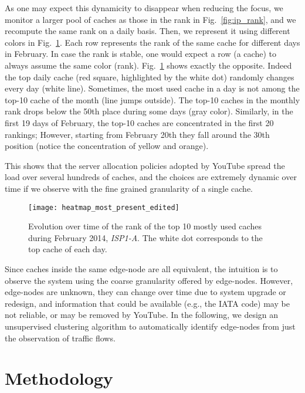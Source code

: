 \documentclass{acm_proc_article-sp}
\newcommand{\node}{{edge-node}\xspace}
\newcommand{\nodes}{{edge-nodes}\xspace}
\newcommand{\TApub}{\textit{ISP1-A}\xspace}
\begin{document}
As one may expect this dynamicity to disappear when reducing the focus, we monitor a larger pool of caches as those in the rank in Fig.~\ref{fig:ip_rank}, and we recompute the same rank on a daily basis. Then, we represent it using different colors in Fig.~\ref{fig:ip_monitoring}. Each row represents the rank of the same cache for different days in February.
In case the rank is stable, one would expect a row (a cache) to always assume the same color (rank). Fig.~\ref{fig:ip_monitoring} shows exactly the opposite. Indeed the top daily cache (red square, highlighted by the white dot) randomly changes every day (white line). Sometimes, the most used cache in a day is not among the top-10 cache of the month (line jumps outside). The top-10 caches in the monthly rank drops below the 50th place during some days (gray color). Similarly, in the first 19 days of February, the top-10 caches are concentrated in the first 20 rankings; However, starting from February 20th they fall around the 30th position (notice the concentration of yellow and orange).

This shows that the server allocation policies adopted by YouTube spread the load over several hundreds of caches, and the choices are extremely dynamic over time if we observe with the fine grained granularity of a single cache.


\begin{figure}[t!]
\centering
    \texttt{[image: heatmap\_most\_present\_edited]}
    \caption{Evolution over time of the rank of the top 10 mostly used caches during February 2014, \TApub. The white dot corresponds to the top cache of each day.}
    \label{fig:ip_monitoring}
\end{figure}


Since caches inside the same \node are all equivalent, the intuition is to observe the system using the coarse granularity offered by \nodes.
However, \nodes are unknown, they can change over time due to system upgrade or redesign, and information that could be available (e.g., the IATA code) may be not reliable, or may be removed by YouTube.
In the following, we design an unsupervised clustering algorithm to automatically identify \nodes from just the observation of traffic flows.

\section{Methodology}
\label{sec:method}
\end{document}

